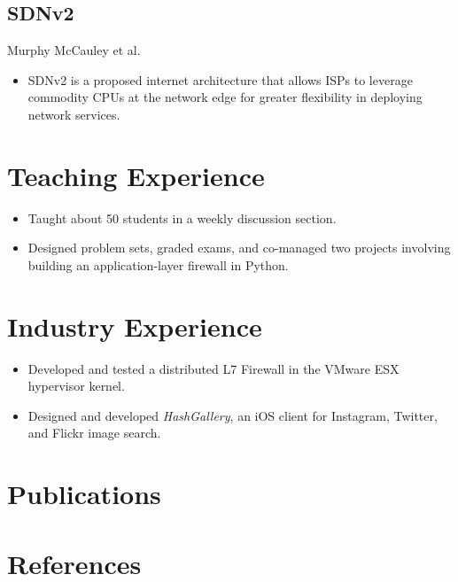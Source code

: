 \documentclass[11pt,letterpaper,sans]{moderncv}
\begin{document}
    \subsection{SDNv2}
    \cvitem{} 
    {
        Murphy McCauley et al.
        \begin{itemize}
            \item SDNv2 is a proposed internet architecture that allows ISPs to leverage commodity CPUs
            at the network edge for greater flexibility in deploying network services.
        \end{itemize}
    }

\section{Teaching Experience}
 {
\begin{itemize}
\item Taught about 50 students in a weekly discussion section.
\item Designed problem sets, graded exams, and co-managed two projects involving
building an application-layer firewall in Python.
\end{itemize}
}

\section{Industry Experience}

 {
\begin{itemize}
\item Developed and tested a distributed L7 Firewall in the VMware
ESX hypervisor kernel.
\end{itemize}
}


 {
\begin{itemize} 
\item Designed and developed \emph{HashGallery}, an iOS client for Instagram,
Twitter, and Flickr image search.
\end{itemize}
}

\section{Publications}


\section{References}
\end{document}
